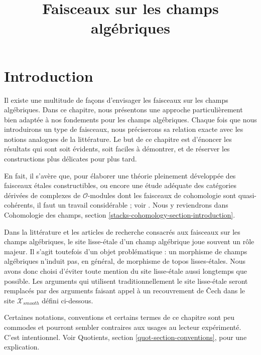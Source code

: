 

%


\title{Faisceaux sur les champs algébriques}


\maketitle

\label{section-phantom}

\tableofcontents

\section{Introduction}
\label{section-introduction}

\noindent
Il existe une multitude de façons d'envisager les faisceaux sur les champs algébriques.
Dans ce chapitre, nous présentons une approche particulièrement bien
adaptée à nos fondements pour les champs algébriques. Chaque fois que nous introduirons
un type de faisceaux, nous préciserons sa relation exacte avec les
notions analogues de la littérature.
Le but de ce chapitre est d'énoncer les résultats
qui sont soit évidents, soit faciles à démontrer,
et de réserver les constructions plus délicates pour plus tard.

\medskip\noindent
En fait, il s'avère que, pour élaborer une théorie pleinement développée des
faisceaux \'etales constructibles, ou encore une étude adéquate des
catégories dérivées de complexes de $\mathcal{O}$-modules dont les
faisceaux de cohomologie sont quasi-cohérents, il faut un travail considérable ; voir
\cite{olsson_sheaves}. Nous y reviendrons dans
Cohomologie des champs, section \ref{stacks-cohomology-section-introduction}.

\medskip\noindent
Dans la littérature et les articles de recherche consacrés aux faisceaux sur les champs
algébriques, le site lisse-\'etale d'un champ algébrique joue souvent un rôle majeur.
Il s'agit toutefois d'un objet problématique : un morphisme de
champs algébriques n'induit pas, en général, de morphisme de topos lisses-\'etales. Nous avons
donc choisi d'éviter toute mention du site lisse-\'etale
aussi longtemps que possible. Les arguments qui utilisent traditionnellement le site lisse-\'etale
seront remplacés par des arguments faisant appel à un recouvrement de {\v C}ech
dans le site $\mathcal{X}_{smooth}$ défini ci-dessous.

\medskip\noindent
Certaines notations, conventions et certains termes de ce chapitre sont peu commodes
et pourront sembler contraires aux usages au lecteur expérimenté. C'est intentionnel.
Voir Quotients, section \ref{quot-section-conventions}, pour une
explication.




